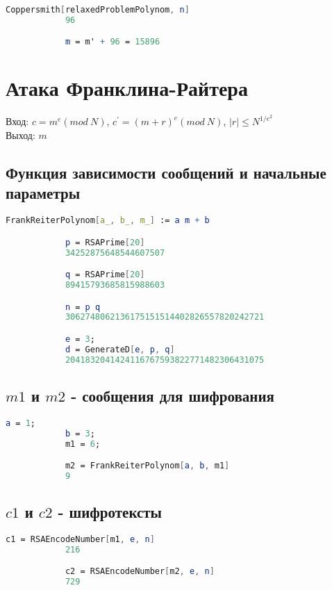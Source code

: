     		\begin{lstlisting}[language=Mathematica,caption={
	      		Решение
	    	}]
			Coppersmith[relaxedProblemPolynom, n]
			96

			m = m' + 96 = 15896
	    	\end{lstlisting}

	\section{Атака Франклина-Райтера}
  		Вход: {$c = m^e (mod \: N)$}, {$c^{'} = (m+r)^e (mod \: N)$}, {$|r| \le N^{1/e^{2}}$} \\
  		Выход: $m$

		\subsection{Функция зависимости сообщений и начальные параметры}

			\begin{lstlisting}[language=Mathematica,caption={
	      		Функция зависимости сообщений и начальные параметры
	    	}]
			FrankReiterPolynom[a_, b_, m_] := a m + b

			p = RSAPrime[20]
			34252875648544607507

			q = RSAPrime[20]
			89415793685815988603

			n = p q
			3062748062136175151514402826557820242721

			e = 3;
			d = GenerateD[e, p, q]
			2041832041424116767593822771482306431075
	    	\end{lstlisting}

    	\subsection{$m1$ и $m2$ - сообщения для шифрования}

    		\begin{lstlisting}[language=Mathematica,caption={
	      		m1 и m2 - сообщения для шифрования
	    	}]
			a = 1;
			b = 3;
			m1 = 6;

			m2 = FrankReiterPolynom[a, b, m1]
			9
	    	\end{lstlisting}

    	\subsection{$c1$ и $c2$ - шифротексты}

    		\begin{lstlisting}[language=Mathematica,caption={
	      		Шифротексты
	    	}]
			c1 = RSAEncodeNumber[m1, e, n]
			216

			c2 = RSAEncodeNumber[m2, e, n]
			729
	    	\end{lstlisting}

